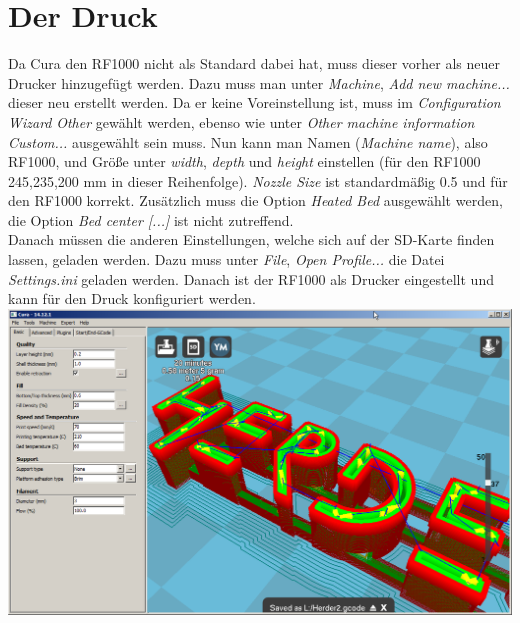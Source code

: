\documentclass[11pt,a4paper]{scrartcl}
\begin{document}
\section{Der Druck}
Da Cura den RF1000 nicht als Standard dabei hat, muss dieser vorher als neuer Drucker hinzugefügt werden. Dazu muss man unter \textit{Machine}, \textit{Add new machine...} dieser neu erstellt werden. Da er keine Voreinstellung ist, muss im \textit{Configuration Wizard} \textit{Other} gewählt werden, ebenso wie unter \textit{Other machine information} \textit{Custom...} ausgewählt sein muss. Nun kann man Namen (\textit{Machine name}), also RF1000, und Größe unter \textit{width}, \textit{depth} und \textit{height} einstellen (für den RF1000 245,235,200 mm in dieser Reihenfolge). \textit{Nozzle Size} ist standardmäßig 0.5 und für den RF1000 korrekt. Zusätzlich muss die Option \textit{Heated Bed} ausgewählt werden, die Option \textit{Bed center [...]} ist nicht zutreffend.\\
Danach müssen die anderen Einstellungen, welche sich auf der SD-Karte finden lassen, geladen werden. Dazu muss unter \textit{File}, \textit{Open Profile...} die Datei \textit{Settings.ini} geladen werden. Danach ist der RF1000 als Drucker eingestellt und kann für den Druck konfiguriert werden.\\
\includegraphics[scale=0.4]{res/Cura-window.png}\\
\end{document}
